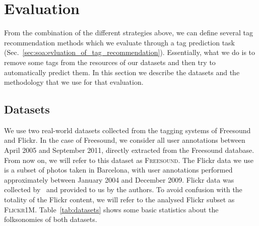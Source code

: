 \section{Evaluation}
\label{sec:general:evaluation_methodology}

From the combination of the different strategies above, we can define several tag recommendation methods which we evaluate through a tag prediction task (Sec.~\ref{sec:soa:evluation_of_tag_recommendation}). Essentially, what we do is to remove some tags from the resources of our datasets and then try to automatically predict them. In this section we describe the datasets and the methodology that we use for that evaluation.

\subsection{Datasets}
\label{sec:general:datasets}
We use two real-world datasets %
collected from the tagging systems of Freesound and Flickr. In the case of Freesound, we consider all user annotations between April 2005 and September 2011, directly extracted from the Freesound database. From now on, we will refer to this dataset as \textsc{Freesound}. The Flickr data we use is a subset of photos taken in Barcelona, with user annotations performed approximately between January 2004 and December 2009. Flickr data was collected by~\cite{papadopoulos2010} and provided to us by the authors. To avoid confusion with the totality of the Flickr content, we will refer to the analysed Flickr subset as \textsc{Flickr1M}. Table~\ref{tab:datasets} shows some basic statistics about the folksonomies of both datasets.

